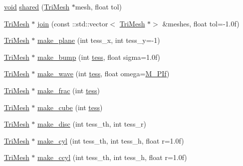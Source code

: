 \begin{DoxyCompactItemize}
\item 
\hyperlink{namespacetrimesh_a784ddfd979e1c579bda795a8edfc3f43}{void} \hyperlink{namespacetrimesh_a369efda9a580f1a92c01b6ce7f90318e}{shared} (\hyperlink{classtrimesh_1_1TriMesh}{Tri\+Mesh} $\ast$mesh, float tol)
\item 
\hyperlink{classtrimesh_1_1TriMesh}{Tri\+Mesh} $\ast$ \hyperlink{namespacetrimesh_ae92a4fbee942b06b47f12ce9fc65f14b}{join} (const \+::std\+::vector$<$ \hyperlink{classtrimesh_1_1TriMesh}{Tri\+Mesh} $\ast$$>$ \&meshes, float tol=-\/1.\+0f)
\item 
\hyperlink{classtrimesh_1_1TriMesh}{Tri\+Mesh} $\ast$ \hyperlink{namespacetrimesh_ab62642fc68697384e554928509b3d54e}{make\+\_\+plane} (int tess\+\_\+x, int tess\+\_\+y=-\/1)
\item 
\hyperlink{classtrimesh_1_1TriMesh}{Tri\+Mesh} $\ast$ \hyperlink{namespacetrimesh_a7b8d1ea4466f1e4fa15da392cfb53c7c}{make\+\_\+bump} (int \hyperlink{namespacetrimesh_ab9faa1a09be480a9b7b63874e84d514c}{tess}, float sigma=1.\+0f)
\item 
\hyperlink{classtrimesh_1_1TriMesh}{Tri\+Mesh} $\ast$ \hyperlink{namespacetrimesh_a5048001851c9e8a3d6ce04c083f1b7e7}{make\+\_\+wave} (int \hyperlink{namespacetrimesh_ab9faa1a09be480a9b7b63874e84d514c}{tess}, float omega=\hyperlink{mathutil_8h_acbb42dc053fedc161079f0a4d20a64e8}{M\+\_\+\+P\+If})
\item 
\hyperlink{classtrimesh_1_1TriMesh}{Tri\+Mesh} $\ast$ \hyperlink{namespacetrimesh_a6e1d422eedb285d1081f85b1af2f6ba3}{make\+\_\+frac} (int \hyperlink{namespacetrimesh_ab9faa1a09be480a9b7b63874e84d514c}{tess})
\item 
\hyperlink{classtrimesh_1_1TriMesh}{Tri\+Mesh} $\ast$ \hyperlink{namespacetrimesh_a4cea0b6c59008a228a49789ddb7ef32a}{make\+\_\+cube} (int \hyperlink{namespacetrimesh_ab9faa1a09be480a9b7b63874e84d514c}{tess})
\item 
\hyperlink{classtrimesh_1_1TriMesh}{Tri\+Mesh} $\ast$ \hyperlink{namespacetrimesh_a1030b871fc3bc5612fef3ceebd64f1c5}{make\+\_\+disc} (int tess\+\_\+th, int tess\+\_\+r)
\item 
\hyperlink{classtrimesh_1_1TriMesh}{Tri\+Mesh} $\ast$ \hyperlink{namespacetrimesh_a903dc8c22c95c9005ccbded226416d17}{make\+\_\+cyl} (int tess\+\_\+th, int tess\+\_\+h, float r=1.\+0f)
\item 
\hyperlink{classtrimesh_1_1TriMesh}{Tri\+Mesh} $\ast$ \hyperlink{namespacetrimesh_a15ed630028c3fbc7ed99a738ba3a3f86}{make\+\_\+ccyl} (int tess\+\_\+th, int tess\+\_\+h, float r=1.\+0f)
\item 
$$
\end{DoxyCompactItemize}
